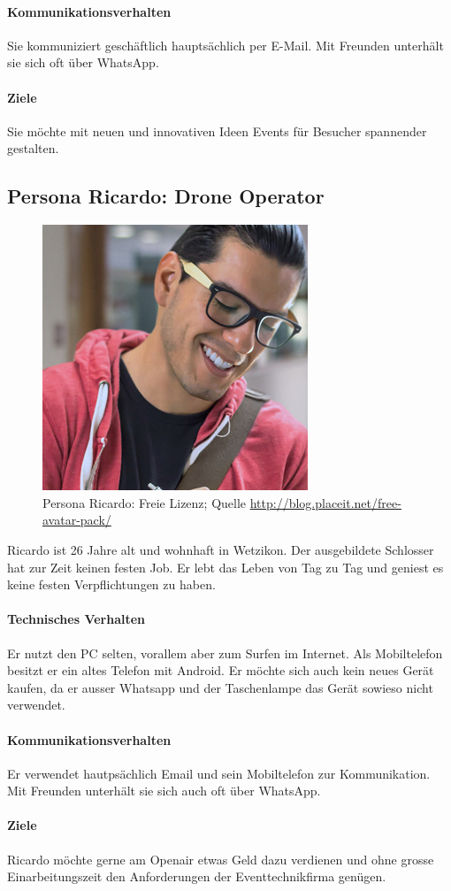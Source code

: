 \paragraph{Kommunikationsverhalten}
Sie kommuniziert geschäftlich hauptsächlich per E-Mail. Mit Freunden unterhält sie sich oft über WhatsApp.
\paragraph{Ziele}
Sie möchte mit neuen und innovativen Ideen Events für Besucher spannender gestalten.

\subsection{Persona Ricardo: Drone Operator}
\begin{figure}[h]
\centering
	\includegraphics[width=.35\textwidth]{images/persona-ricardo.jpg}
	\caption{Persona Ricardo: Freie Lizenz; Quelle
	 \protect\url{http://blog.placeit.net/free-avatar-pack/}}
	\label{fig:ricardo}
\end{figure}
Ricardo ist 26 Jahre alt und wohnhaft in Wetzikon. Der ausgebildete Schlosser hat zur Zeit keinen festen Job. Er lebt das Leben von Tag zu Tag und geniest es keine festen Verpflichtungen zu haben.
\paragraph{Technisches Verhalten}
Er nutzt den PC selten, vorallem aber zum Surfen im Internet. Als Mobiltelefon besitzt er ein altes Telefon mit Android. Er möchte sich auch kein neues Gerät kaufen, da er ausser Whatsapp und der Taschenlampe das Gerät sowieso nicht verwendet.
\paragraph{Kommunikationsverhalten}
Er verwendet hautpsächlich Email und sein Mobiltelefon zur Kommunikation. Mit Freunden unterhält sie sich auch oft über WhatsApp.
\paragraph{Ziele}
Ricardo möchte gerne am Openair etwas Geld dazu verdienen und ohne grosse Einarbeitungszeit den Anforderungen der Eventtechnikfirma genügen.
\newpage
